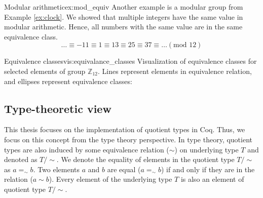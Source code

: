 \begin{example}{Modular arithmetic}{ex:mod_equiv}
Another example is a modular group from Example \ref{ex:clock}. We showed that multiple integers have the same value in modular arithmetic. Hence, all numbers with the same value are in the same equivalence class.
$$ \dots \equiv -11 \equiv 1 \equiv 13 \equiv 25 \equiv 37 \equiv \dots (\textrm{mod } 12) $$
\end{example}
\begin{vis}[G]{Equivalence classes}{vis:equivalance_classes}
Visualization of equivalence classes for selected elements of group $\mathbb{Z}_{12}$. Lines represent elements in equivalence relation, and ellipses represent equivalence classes:
\begin{center}
\end{center}
\end{vis}

\subsection{Type-theoretic view}
This thesis focuses on the implementation of quotient types in Coq. Thus, we focus on this concept from the type theory perspective. In type theory, quotient types are also induced by some equivalence relation ($\sim$) on underlying type $T$ and denoted as $T/\sim$. We denote the equality of elements in the quotient type $T/\sim$ as $a =_\sim b$. Two elements $a$ and $b$ are equal ($a =_\sim b$) if and only if they are in the relation ($a \sim b$). Every element of the underlying type $T$ is also an element of quotient type $T/\sim$.

